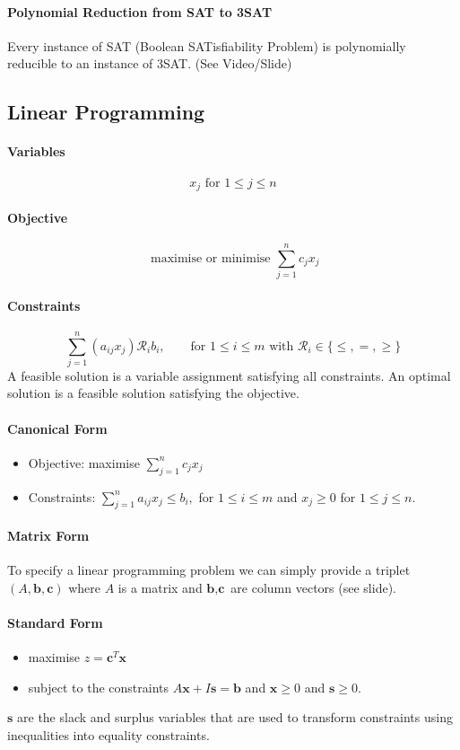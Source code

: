\paragraph{Polynomial Reduction from SAT to 3SAT}
Every instance of SAT (Boolean SATisfiability Problem) is polynomially reducible to an instance of 3SAT. (See Video/Slide)

\subsection{Linear Programming}

\paragraph{Variables} 
\[x_j \text{ for } 1 \leq j \leq n\]
\paragraph{Objective}
\[\text{ maximise or minimise } \sum_{j=1}^n c_j x_j\]
\paragraph{Constraints}
\[\sum_{j=1}^n (a_{ij}x_j)\mathcal{R}_ib_i, \qquad \text{for } 1\leq i \leq m \text{ with } \mathcal{R}_i \in \{\leq, =, \geq \}\]
A feasible solution is a variable assignment satisfying all constraints. An optimal solution is a feasible solution satisfying the objective.

\paragraph{Canonical Form}
\begin{itemize}
    \item Objective: maximise \(\sum_{j=1}^n c_jx_j\)
    \item Constraints: \(\sum_{j=1}^n a_{ij}x_j \leq b_i,\) for \(1 \leq i \leq m\) and \(x_j \geq 0\) for \(1 \leq j \leq n\).
\end{itemize}

\paragraph{Matrix Form}
To specify a linear programming problem we can simply provide a triplet \((A,\textbf{b},\textbf{c})\) where \(A\) is a matrix and  \(\textbf{b},\textbf{c}\) are column vectors (see slide).

\paragraph{Standard Form}
\begin{itemize}
    \item maximise \(z = \textbf{c}^T\textbf{x}\)
    \item subject to the constraints \(A\textbf{x}+I\textbf{s}=\textbf{b}\) and \(\textbf{x} \geq 0\) and \(\textbf{s} \geq 0\).
\end{itemize}
\(\textbf{s}\) are the slack and surplus variables that are used to transform constraints using inequalities into equality constraints.

